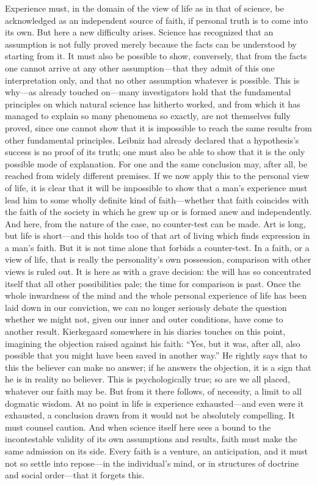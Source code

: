 \documentclass[12pt,a4paper]{article}
\newcommand{\opage}[1]{\marginnote{\footnotesize\textit{[#1]}}}
\begin{document}
Experience must, in the domain of the view of life as in that of science, be
acknowledged as an independent source of faith, if personal truth is to come into its
own. But here a new difficulty arises. Science has recognized that an assumption is not
fully proved merely because the facts can be understood by starting from it. It must
also be possible to show, conversely, that \opage{54}from the facts one cannot arrive at any
other assumption---that they admit of this one interpretation only, and that no other
assumption whatever is possible. This is why---as already touched on---many
investigators hold that the fundamental principles on which natural science has
hitherto worked, and from which it has managed to explain so many phenomena so exactly,
are not themselves fully proved, since one cannot show that it is impossible to reach
the same results from other fundamental principles. Leibniz had already declared that a
hypothesis's success is no proof of its truth; one must also be able to show that it is
the only possible mode of explanation. For one and the same conclusion may, after all,
be reached from widely different premises. If we now apply this to the personal view of
life, it is clear that it will be impossible to show that a man's experience must lead
him to some wholly definite kind of faith---whether that faith coincides with the faith
of the society in which he grew up or is formed anew and independently. And here, from
the nature of the case, no counter-test can be made. Art is long, but life is
short---and this holds too of that art of living which finds expression in a man's
faith. But it is not time alone that forbids a counter-test. In a faith, or a view of
life, that is really the personality's own possession, comparison with other views is
ruled out. It is here as with a grave decision: the will has so concentrated itself
that all other possibilities pale; the time for comparison is past. Once the whole
inwardness of the mind and the whole personal experience of life has been laid down in
our conviction, we can no longer seriously debate the question whether we might not,
given our inner and outer conditions, have come to another result. Kierkegaard
somewhere in his diaries touches on this point, imagining \opage{55}the objection raised against
his faith: ``Yes, but it was, after all, also possible that you might have been saved
in another way.'' He rightly says that to this the believer can make no answer; if he
answers the objection, it is a sign that he is in reality no believer. This is
psychologically true; so are we all placed, whatever our faith may be. But from it
there follows, of necessity, a limit to all dogmatic wisdom. At no point in life is
experience exhausted---and even were it exhausted, a conclusion drawn from it would not
be absolutely compelling. It must counsel caution. And when science itself here sees a
bound to the incontestable validity of its own assumptions and results, faith must make
the same admission on its side. Every faith is a venture, an anticipation, and it must
not so settle into repose---in the individual's mind, or in structures of doctrine and
social order---that it forgets this.
\end{document}
